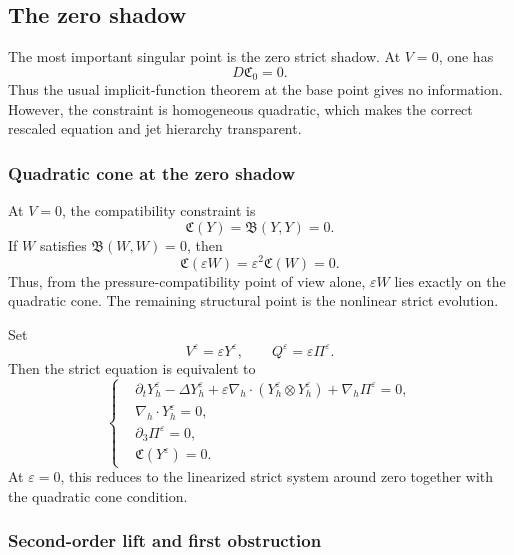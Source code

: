 \documentclass[11pt]{article}
\numberwithin{equation}{section}
\theoremstyle{plain}
\theoremstyle{definition}
\theoremstyle{remark}
\newcommand{\eps}{\varepsilon}
\newcommand{\nabh}{\nabla_h}
\newcommand{\divh}{\nabla_h\!\cdot}
\newcommand{\calB}{\mathfrak B}
\newcommand{\calC}{\mathfrak C}
\begin{document}
\subsection{The zero shadow}\label{pIII:sec:zero-shadow}

The most important singular point is the zero strict shadow.  At \(V=0\), one has
\[
        D\calC_0=0.
\]
Thus the usual implicit-function theorem at the base point gives no information.  However,
the constraint is homogeneous quadratic, which makes the correct rescaled equation and jet
hierarchy transparent.

\subsubsection{Quadratic cone at the zero shadow}

At \(V=0\), the compatibility constraint is
\begin{equation}\label{pIII:eq:cone-zero}
        \calC(Y)=\calB(Y,Y)=0.
\end{equation}
If \(W\) satisfies \(\calB(W,W)=0\), then
\begin{equation}\label{pIII:eq:epsilonW-compatible}
        \calC(\eps W)=\eps^2\calC(W)=0.
\end{equation}
Thus, from the pressure-compatibility point of view alone, \(\eps W\) lies exactly on the
quadratic cone.  The remaining structural point is the nonlinear strict evolution.

Set
\begin{equation}\label{pIII:eq:rescale-VQ}
        V^\eps=\eps Y^\eps,
        \qquad
        Q^\eps=\eps\Pi^\eps.
\end{equation}
Then the strict equation is equivalent to
\begin{equation}\label{pIII:eq:rescaled-strict}
\left\{
\begin{aligned}
        &\partial_tY_h^\eps-\Delta Y_h^\eps
        +\eps\nabh\cdot(Y_h^\eps\otimes Y_h^\eps)
        +\nabh\Pi^\eps=0,\\
        &\divh Y_h^\eps=0,\\
        &\partial_3\Pi^\eps=0,\\
        &\calC(Y^\eps)=0.
\end{aligned}
\right.
\end{equation}
At \(\eps=0\), this reduces to the linearized strict system around zero together with the
quadratic cone condition.

\subsubsection{Second-order lift and first obstruction}
\end{document}
